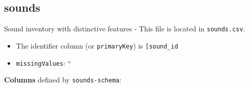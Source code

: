 \hypertarget{sounds}{%
\subsection{\texorpdfstring{\textbf{sounds}}{sounds}}\label{sounds}}

Sound inventory with distinctive features - This file is located in
\texttt{sounds.csv}.

\begin{itemize}
\tightlist
\item
  The identifier column (or \texttt{primaryKey}) is
  \texttt{{[}\textquotesingle{}sound\_id\textquotesingle{}{]}}
\item
  \texttt{missingValues}: ``
\end{itemize}

\textbf{Columns} defined by \texttt{sounds-schema}:

